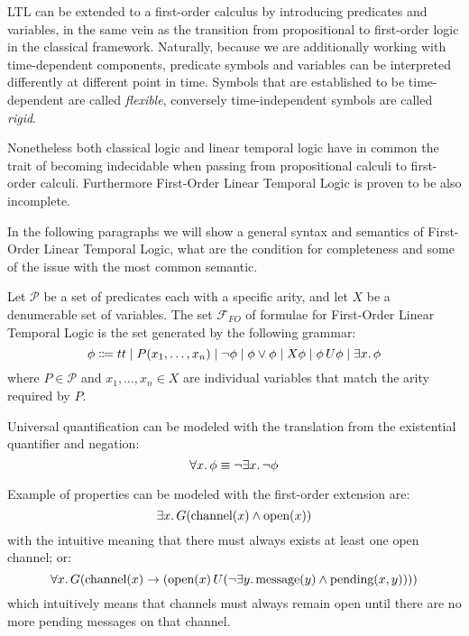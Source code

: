 LTL can be extended to a first-order calculus by introducing predicates and variables, in the same vein as the
transition from propositional to first-order logic in the classical framework. Naturally, because we are additionally
working with time-dependent components, predicate symbols and variables can be interpreted differently at different
point in time. Symbols that are established to be time-dependent are called \emph{flexible}, conversely time-independent
symbols are called \emph{rigid}.

Nonetheless both classical logic and linear temporal logic have in common the trait of becoming indecidable when passing
from propositional calculi to first-order calculi. Furthermore First-Order Linear Temporal Logic is proven to be also
incomplete.

In the following paragraphs we will show a general syntax and semantics of First-Order Linear Temporal Logic, what are
the condition for completeness and some of the issue with the most common semantic.

\begin{definition}\label{def:kripkefoltlsyn}
  Let $\mathcal{P}$ be a set of predicates each with a specific arity, and let $X$ be a denumerable set of variables.
  The set $\mathcal{F}_{FO}$ of formulae for First-Order Linear Temporal Logic is the set generated by the following grammar:
  \[
    \phi \Coloneqq tt \;|\; P(x_1, \ldots, x_n)
                      \;|\; \neg\phi
                      \;|\; \phi \lor \phi
                      \;|\; X{\phi}
                      \;|\; {\phi}\,U {\phi}
                      \;|\; \exists {x} \ldotp {\phi}
  \]
  where $P \in \mathcal{P}$ and $x_1, \ldots, x_n \in X$ are individual variables that match the arity required by $P$.
\end{definition}
Universal quantification can be modeled with the translation from the existential quantifier and negation:
\[
  \forall {x} \ldotp {\phi} \equiv \neg\exists {x} \ldotp {\neg\phi}
\]

Example of properties can be modeled with the first-order extension are:
\[
  \exists {x} \ldotp {G(\text{channel}(x) \land \text{open}(x))}
\]
with the intuitive meaning that there must always exists at least one open channel; or:
\[
  \forall {x} \ldotp {G(\text{channel}(x) \to ({\text{open}(x)}\,U {(\neg\exists {y} \ldotp {\text{message}(y) \land \text{pending}(x, y)})}))}
\]
which intuitively means that channels must always remain open until there are no more pending messages on that channel.

